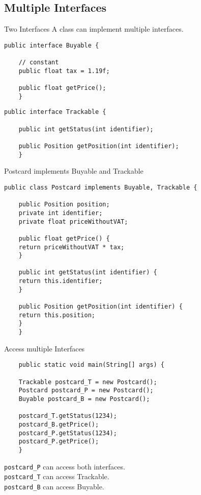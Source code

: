 \subsection{Multiple Interfaces}
\begin{frame}[fragile]{Two Interfaces}
	A class can implement multiple interfaces.
	\vfill
	\begin{lstlisting}[basicstyle=\ttfamily\scriptsize]
	public interface Buyable {
	
	// constant
	public float tax = 1.19f;
	
	public float getPrice();
	}
	\end{lstlisting}
	\begin{lstlisting}[basicstyle=\ttfamily\scriptsize]
	public interface Trackable {
	
	public int getStatus(int identifier);
	
	public Position getPosition(int identifier);
	}
	\end{lstlisting}
\end{frame}

\begin{frame}[fragile]{Postcard implements Buyable and Trackable}
	\begin{lstlisting}[basicstyle=\ttfamily\scriptsize]
	public class Postcard implements Buyable, Trackable {
	
	public Position position;
	private int identifier;
	private float priceWithoutVAT;
	
	public float getPrice() {
	return priceWithoutVAT * tax;
	}
	
	public int getStatus(int identifier) {
	return this.identifier;
	}
	
	public Position getPosition(int identifier) {
	return this.position;
	}
	}
	\end{lstlisting}
\end{frame}

\begin{frame}[fragile]{Access multiple Interfaces}
	\begin{lstlisting}
	public static void main(String[] args) {
	
	Trackable postcard_T = new Postcard();
	Postcard postcard_P = new Postcard();
	Buyable postcard_B = new Postcard();
	
	postcard_T.getStatus(1234);
	postcard_B.getPrice();
	postcard_P.getStatus(1234);
	postcard_P.getPrice();
	}
	\end{lstlisting}
	\texttt{postcard\_P} can access both interfaces.\\
	\texttt{postcard\_T} can access Trackable.\\
	\texttt{postcard\_B} can access Buyable.
\end{frame}


